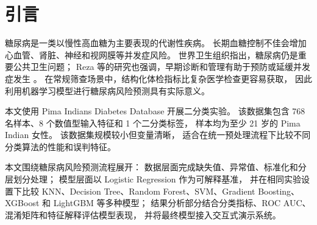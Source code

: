 \section{引言}

糖尿病是一类以慢性高血糖为主要表现的代谢性疾病。
长期血糖控制不佳会增加心血管、肾脏、神经和视网膜等并发症风险。
世界卫生组织指出，糖尿病仍是重要公共卫生问题；
Reza 等的研究也强调，早期诊断和管理有助于预防或延缓并发症发生
\cite{whoDiabetesFactSheet2024,rezaImprovingDiabetesDisease2024}。
在常规筛查场景中，结构化体检指标比复杂医学检查更容易获取，
因此利用机器学习模型进行糖尿病风险预测具有实际意义。

本文使用 Pima Indians Diabetes Database 开展二分类实验。
该数据集包含 768 名样本、8 个数值型输入特征和 1 个二分类标签，
样本均为至少 21 岁的 Pima Indian 女性\cite{uci_pima}。
该数据集规模较小但变量清晰，
适合在统一预处理流程下比较不同分类算法的性能和误判特征。

本文围绕糖尿病风险预测流程展开：
数据层面完成缺失值、异常值、标准化和分层划分处理；
模型层面以 Logistic Regression 作为可解释基准，
并在相同实验设置下比较 KNN、Decision Tree、Random Forest、SVM、Gradient Boosting、XGBoost 和 LightGBM 等多种模型；
结果分析部分结合分类指标、ROC AUC、混淆矩阵和特征解释评估模型表现，
并将最终模型接入交互式演示系统。
